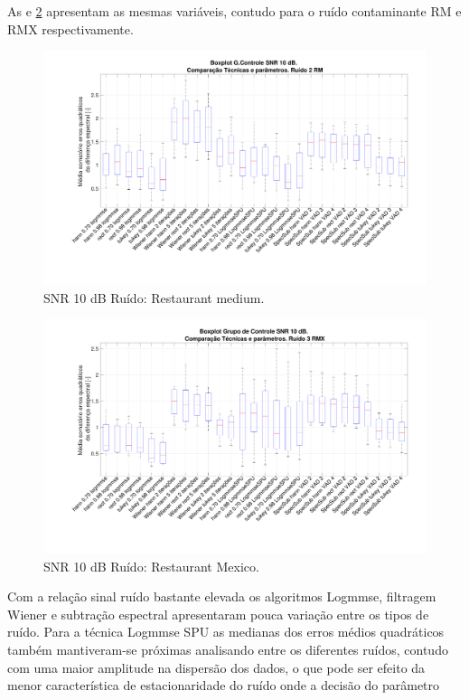 As  e \ref{snr10_3} apresentam as mesmas variáveis, contudo para o ruído contaminante RM e RMX respectivamente.

\begin{figure}[H]
\centering
\includegraphics[width=16cm]{Figs/Erro_10_Ruido2.pdf}
\caption{SNR 10 dB Ruído: Restaurant medium.}
\label{snr10_2}
\end{figure}

\begin{figure}[H]
\centering
\includegraphics[width=16cm]{Figs/Erro_10_Ruido3.pdf}
\caption{SNR 10 dB Ruído: Restaurant Mexico.}
\label{snr10_3}
\end{figure}

Com a relação sinal ruído bastante elevada os algoritmos Logmmse, filtragem Wiener e subtração espectral apresentaram pouca variação entre os tipos de ruído. Para a técnica Logmmse SPU as medianas dos erros médios quadráticos também mantiveram-se próximas analisando entre os diferentes ruídos, contudo com uma maior amplitude na dispersão dos dados, o que pode ser efeito da menor característica de estacionaridade do ruído onde a decisão do parâmetro  


